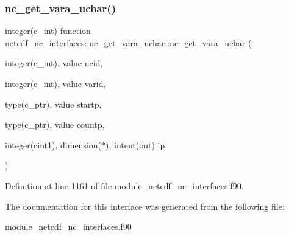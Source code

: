 \subsubsection{\texorpdfstring{nc\+\_\+get\+\_\+vara\+\_\+uchar()}{nc\_get\_vara\_uchar()}}
{\footnotesize\ttfamily integer(c\+\_\+int) function netcdf\+\_\+nc\+\_\+interfaces\+::nc\+\_\+get\+\_\+vara\+\_\+uchar\+::nc\+\_\+get\+\_\+vara\+\_\+uchar (\begin{DoxyParamCaption}\item[{integer(c\+\_\+int), value}]{ncid,  }\item[{integer(c\+\_\+int), value}]{varid,  }\item[{type(c\+\_\+ptr), value}]{startp,  }\item[{type(c\+\_\+ptr), value}]{countp,  }\item[{integer(cint1), dimension($\ast$), intent(out)}]{ip }\end{DoxyParamCaption})}



Definition at line 1161 of file module\+\_\+netcdf\+\_\+nc\+\_\+interfaces.\+f90.



The documentation for this interface was generated from the following file\+:\begin{DoxyCompactItemize}
\item 
\hyperlink{module__netcdf__nc__interfaces_8f90}{module\+\_\+netcdf\+\_\+nc\+\_\+interfaces.\+f90}\end{DoxyCompactItemize}
